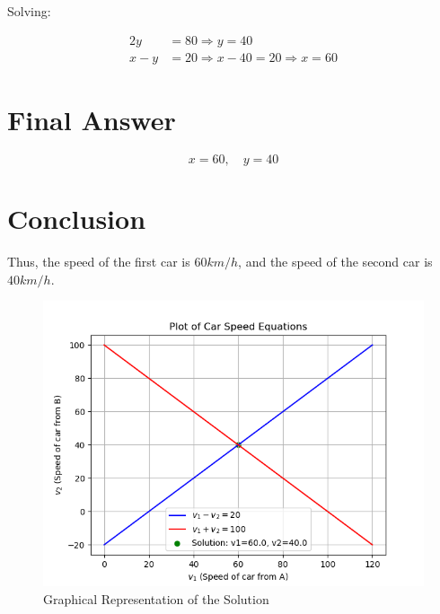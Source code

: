\documentclass[journal]{IEEEtran}
\begin{document}
Solving:

\begin{align}
    2y &= 80 \Rightarrow y = 40 \\
    x - y &= 20 \Rightarrow x - 40 = 20 \Rightarrow x = 60
\end{align}

\section*{Final Answer}
\begin{equation}
    \boxed{x = 60, \quad y = 40}
\end{equation}

\section*{Conclusion}
Thus, the speed of the first car is $60 km/h$, and the speed of the second car is $40 km/h$.

\begin{figure}[ht]
    \centering
    \includegraphics[width=0.7\columnwidth]{figs/Figure_1.png}
    \caption{Graphical Representation of the Solution}
    \label{fig:Plot1}
\end{figure}
\end{document}
